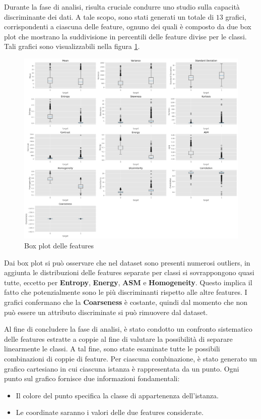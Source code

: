 Durante la fase di analisi, risulta cruciale condurre uno studio sulla capacità
discriminante dei dati. A tale scopo, sono stati generati un totale di $13$
grafici, corrispondenti a ciascuna delle feature, ognuno dei quali è composto da 
due box plot che mostrano la suddivisione in percentili delle feature divise per 
le classi. Tali grafici sono visualizzabili nella figura \ref{fig:boxplot_features}.
\newpage
\begin{figure}[!ht]
      \centering
      \includegraphics[width=\textwidth]{img/analisi/boxplot.png}
      \caption{Box plot delle features}
      \label{fig:boxplot_features}
\end{figure}

Dai box plot si può osservare che nel dataset sono presenti numerosi outliers, in
aggiunta le distribuzioni delle features separate per classi si sovrappongono
quasi tutte, eccetto per \textbf{Entropy}, \textbf{Energy}, \textbf{ASM} e
\textbf{Homogeneity}. Questo implica il fatto che potenzialmente sono le più
discriminanti rispetto alle altre features. I grafici confermano che la 
\textbf{Coarseness} è costante, quindi dal momento che non può essere un
attributo discriminate si può rimuovere dal dataset.

Al fine di concludere la fase di analisi, è stato condotto un confronto
sistematico delle features estratte a coppie al fine di valutare la possibilità
di separare linearmente le classi. A tal fine, sono state esaminate tutte le
possibili combinazioni di coppie di feature. Per ciascuna combinazione, è stato
generato un grafico cartesiano in cui ciascuna istanza è rappresentata da un
punto. Ogni punto sul grafico fornisce due informazioni fondamentali:
\begin{itemize}
      \item Il colore del punto specifica la classe di appartenenza dell'istanza.
      \item Le coordinate saranno i valori delle due features considerate.
\end{itemize}

